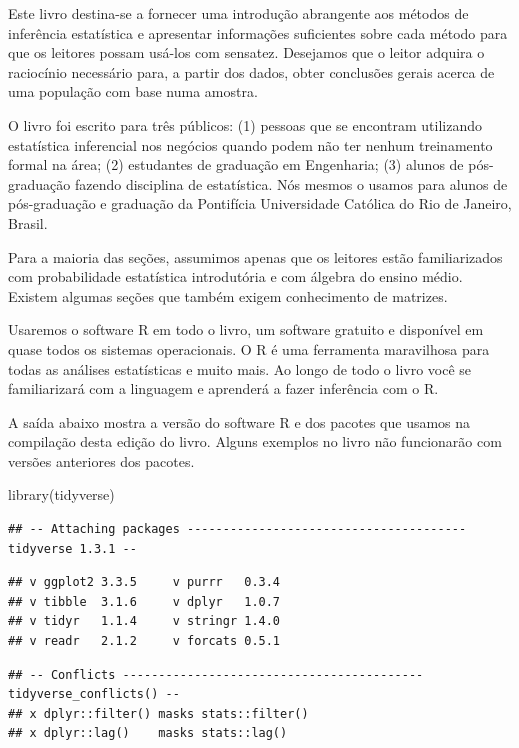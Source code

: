\documentclass[
]{book}
\newenvironment{Shaded}{\begin{snugshade}}{\end{snugshade}}
\newcommand{\FunctionTok}[1]{\textcolor[rgb]{0.00,0.00,0.00}{#1}}
\newcommand{\NormalTok}[1]{#1}
\begin{document}
Este livro destina-se a fornecer uma introdução abrangente aos métodos de inferência estatística e apresentar informações suficientes sobre cada método para que os leitores possam usá-los com sensatez. Desejamos que o leitor adquira o raciocínio necessário para, a partir dos dados,
obter conclusões gerais acerca de uma população com base numa amostra.

O livro foi escrito para três públicos: (1) pessoas que se encontram utilizando estatística inferencial nos negócios quando podem não ter nenhum treinamento formal na área; (2) estudantes de graduação em Engenharia; (3) alunos de pós-graduação fazendo disciplina de estatística. Nós mesmos o usamos para alunos de pós-graduação e graduação da Pontifícia Universidade Católica do Rio de Janeiro, Brasil.

Para a maioria das seções, assumimos apenas que os leitores estão familiarizados com probabilidade estatística introdutória e com álgebra do ensino médio. Existem algumas seções que também exigem conhecimento de matrizes.

Usaremos o software R em todo o livro, um software gratuito e disponível em quase todos os sistemas operacionais. O R é uma ferramenta maravilhosa para todas as análises estatísticas e muito mais. Ao longo de todo o livro você se familiarizará com a linguagem e aprenderá a fazer inferência com o R.

A saída abaixo mostra a versão do software R e dos pacotes que usamos na compilação desta edição do livro. Alguns exemplos no livro não funcionarão com versões anteriores dos pacotes.

\begin{Shaded}
\begin{Highlighting}[]
\FunctionTok{library}\NormalTok{(tidyverse)}
\end{Highlighting}
\end{Shaded}

\begin{verbatim}
## -- Attaching packages --------------------------------------- tidyverse 1.3.1 --
\end{verbatim}

\begin{verbatim}
## v ggplot2 3.3.5     v purrr   0.3.4
## v tibble  3.1.6     v dplyr   1.0.7
## v tidyr   1.1.4     v stringr 1.4.0
## v readr   2.1.2     v forcats 0.5.1
\end{verbatim}

\begin{verbatim}
## -- Conflicts ------------------------------------------ tidyverse_conflicts() --
## x dplyr::filter() masks stats::filter()
## x dplyr::lag()    masks stats::lag()
\end{verbatim}
\end{document}
